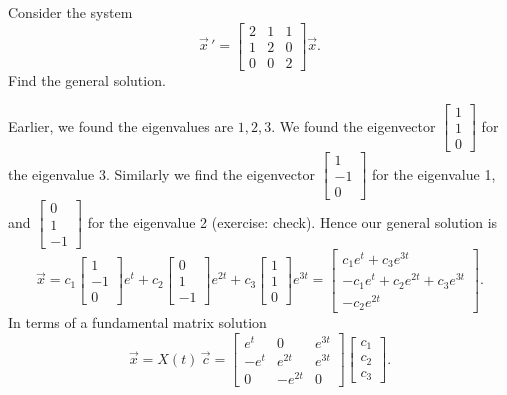 \documentclass[12pt]{book}
\begin{document}
\begin{example}
Consider the system
\begin{equation*}
{\vec{x}\,}'
=
\begin{bmatrix}
2 & 1 & 1 \\
1 & 2 & 0 \\
0 & 0 & 2
\end{bmatrix}
\vec{x} .
\end{equation*}
Find the general solution.

Earlier, we found the eigenvalues are $1,2,3$.  We found the eigenvector
$\left[ \begin{smallmatrix} 1 \\ 1 \\ 0 \end{smallmatrix} \right]$
for the eigenvalue 3.  Similarly
we find the eigenvector 
$\left[ \begin{smallmatrix} 1 \\ -1 \\ 0 \end{smallmatrix} \right]$
for the eigenvalue 1, and 
$\left[ \begin{smallmatrix} 0 \\ 1 \\ -1 \end{smallmatrix} \right]$
for the eigenvalue 2 (exercise: check).
Hence our general solution is
\begin{equation*}
\vec{x} =
c_1
\begin{bmatrix}
1 \\ -1 \\ 0
\end{bmatrix}
e^t
+
c_2
\begin{bmatrix}
0 \\ 1 \\ -1
\end{bmatrix}
e^{2t}
+
c_3
\begin{bmatrix}
1 \\ 1 \\ 0
\end{bmatrix}
e^{3t} 
=
\begin{bmatrix}
c_1 e^t+c_3 e^{3t} \\ -c_1 e^t + c_2 e^{2t} + c_3 e^{3t} \\ - c_2 e^{2t}
\end{bmatrix} .
\end{equation*}
In terms of a fundamental matrix solution
\begin{equation*}
\vec{x} = X(t)\, \vec{c}
=
\begin{bmatrix}
e^t & 0 & e^{3t} \\
-e^t & e^{2t} & e^{3t} \\
0 & -e^{2t} & 0
\end{bmatrix}
\begin{bmatrix}
c_1 \\ c_2 \\ c_3
\end{bmatrix} .
\end{equation*}
\end{example}
\end{document}
